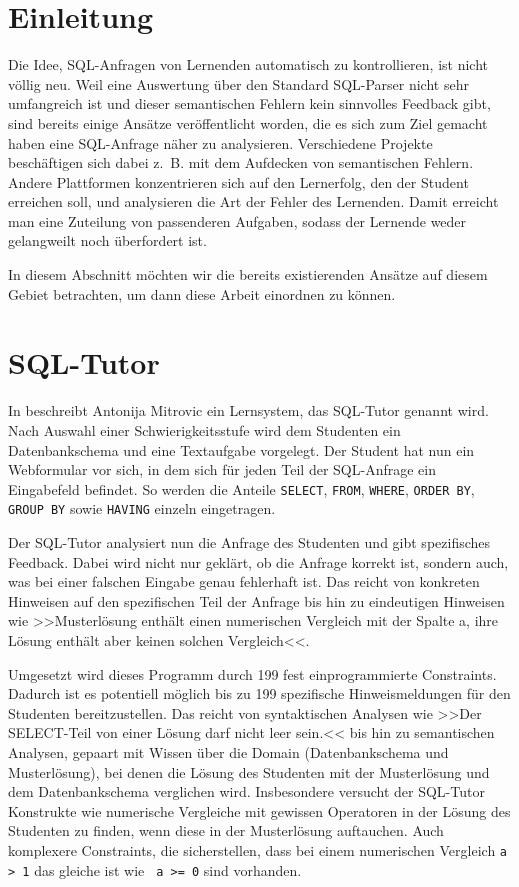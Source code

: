 \section{Einleitung}

Die Idee, SQL-Anfragen von Lernenden automatisch zu kontrollieren, ist nicht völlig neu. Weil eine Auswertung über den Standard SQL-Parser nicht sehr umfangreich ist und dieser semantischen Fehlern kein sinnvolles Feedback gibt, sind bereits einige Ansätze veröffentlicht worden, die es sich zum Ziel gemacht haben eine SQL-Anfrage näher zu analysieren. Verschiedene Projekte beschäftigen sich dabei \mbox{z. B.} mit dem Aufdecken von semantischen Fehlern. Andere Plattformen konzentrieren sich auf den Lernerfolg, den der Student erreichen soll, und analysieren die Art der Fehler des Lernenden. Damit erreicht man eine Zuteilung von passenderen Aufgaben, sodass der Lernende weder gelangweilt noch überfordert ist. %

In diesem Abschnitt möchten wir die bereits existierenden Ansätze auf diesem Gebiet betrachten, um dann diese Arbeit einordnen zu können.

\section{SQL-Tutor}

In \cite{sqltut1} beschreibt Antonija Mitrovic ein Lernsystem, das SQL-Tutor genannt wird. Nach Auswahl einer Schwierigkeitsstufe wird dem Studenten ein Datenbankschema und eine Textaufgabe vorgelegt. Der Student hat nun ein Webformular vor sich, in dem sich für jeden Teil der SQL-Anfrage ein Eingabefeld befindet. So werden die Anteile \verb|SELECT|, \verb|FROM|, \verb|WHERE|, \verb|ORDER BY|, \verb|GROUP BY| sowie \verb|HAVING| einzeln eingetragen.

Der SQL-Tutor analysiert nun die Anfrage des Studenten und gibt spezifisches Feedback. Dabei wird nicht nur geklärt, ob die Anfrage korrekt ist, sondern auch, was bei einer falschen Eingabe genau fehlerhaft ist. Das reicht von konkreten Hinweisen auf den spezifischen Teil der Anfrage bis hin zu eindeutigen Hinweisen wie >>Musterlösung enthält einen numerischen Vergleich mit der Spalte a, ihre Lösung enthält aber keinen solchen Vergleich<<.

Umgesetzt wird dieses Programm durch 199 fest einprogrammierte Constraints. Dadurch ist es potentiell möglich bis zu 199 spezifische Hinweismeldungen für den Studenten bereitzustellen. Das reicht von syntaktischen Analysen wie >>Der SELECT-Teil von einer Lösung darf nicht leer sein.<< bis hin zu semantischen Analysen, gepaart mit Wissen über die Domain (Datenbankschema und Musterlösung), bei denen die Lösung des Studenten mit der Musterlösung und dem Datenbankschema verglichen wird. Insbesondere versucht der SQL-Tutor Konstrukte wie numerische Vergleiche mit gewissen Operatoren in der Lösung des Studenten zu finden, wenn diese in der Musterlösung auftauchen. Auch komplexere Constraints, die sicherstellen, dass bei einem numerischen Vergleich \verb|a > 1| das gleiche ist wie \verb| a >= 0| sind vorhanden. 

